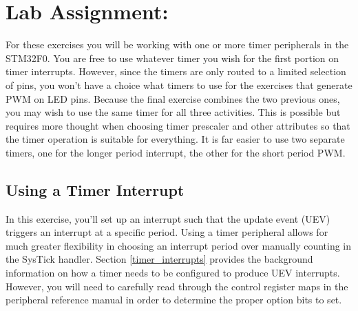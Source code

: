 \documentclass[11pt,fleqn]{book} %
\begin{document}
\section{Lab Assignment:}
For these exercises you will be working with one or more timer peripherals in the STM32F0. You are free to use whatever timer you wish for the first portion on timer interrupts. However, since the timers are only routed to a limited selection of pins, you won't have a choice what timers to use for the exercises that generate PWM on  LED pins.  
Because the final exercise combines the two previous ones, you may wish to use the same timer for all three activities. This is possible but requires more thought when choosing timer prescaler and other attributes so that the timer operation is suitable for everything. It is far easier to use two separate timers, one for the longer period interrupt, the other for the short period PWM. 

\subsection{Using a Timer Interrupt}
In this exercise, you'll set up an interrupt such that the update event (UEV) triggers an interrupt at a specific period. Using a timer peripheral allows for much greater flexibility in choosing an interrupt period over manually counting in the SysTick handler. Section \ref{timer_interrupts} provides the background information on how a timer needs to be configured to produce UEV interrupts. However, you will need to carefully read through the control register maps in the peripheral reference manual in order to determine the proper option bits to set. 
\end{document}
